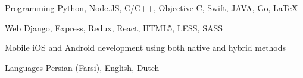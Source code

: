 

\begin{cvskills}

  \cvskill
    {Programming} %
    {Python, Node.JS, C/C++, Objective-C, Swift, JAVA, Go, LaTeX} %

  \cvskill
    {Web} %
    {Django, Express, Redux, React, HTML5, LESS, SASS} %

  \cvskill
    {Mobile} %
    {iOS and Android development using both native and hybrid methods} %

  \cvskill
    {Languages} %
    {Persian (Farsi), English, Dutch} %

\end{cvskills}

